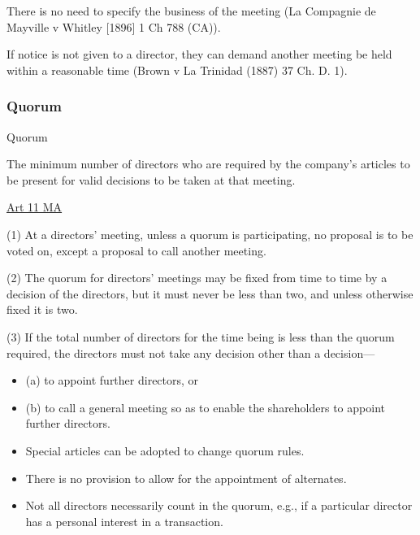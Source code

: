 \documentclass[
]{article}
\providecommand{\tightlist}{%
  \setlength{\itemsep}{0pt}\setlength{\parskip}{0pt}}
\newenvironment{env-12fb5320-b8eb-47b6-8035-097e16242c42}
{
    \savenotes\tcolorbox[blanker,breakable,left=5pt,borderline west={2pt}{-4pt}{green}]
}
{
    \endtcolorbox\spewnotes
}
\newenvironment{env-b20d3313-6f31-4d49-96f7-b40d8676adb1}
{
    \savenotes\tcolorbox[blanker,breakable,left=5pt,borderline west={2pt}{-4pt}{yellow}]
}
{
    \endtcolorbox\spewnotes
}
\begin{document}
There is no need to specify the business of the meeting (La Compagnie de
Mayville v Whitley {[}1896{]} 1 Ch 788 (CA)).

If notice is not given to a director, they can demand another meeting be
held within a reasonable time (Brown v La Trinidad (1887) 37 Ch. D. 1).

\hypertarget{quorum}{%
\subsubsection{Quorum}\label{quorum}}

\begin{env-b20d3313-6f31-4d49-96f7-b40d8676adb1}

Quorum

The minimum number of directors who are required by the company's
articles to be present for valid decisions to be taken at that meeting.

\end{env-b20d3313-6f31-4d49-96f7-b40d8676adb1}

\begin{env-12fb5320-b8eb-47b6-8035-097e16242c42}

\href{https://www.gov.uk/government/publications/model-articles-for-private-companies-limited-by-shares/model-articles-for-private-companies-limited-by-shares\#quorum}{Art
11 MA}

(1) At a directors' meeting, unless a quorum is participating, no
proposal is to be voted on, except a proposal to call another meeting.

(2) The quorum for directors' meetings may be fixed from time to time by
a decision of the directors, but it must never be less than two, and
unless otherwise fixed it is two.

(3) If the total number of directors for the time being is less than the
quorum required, the directors must not take any decision other than a
decision---

\begin{itemize}
\tightlist
\item
  (a) to appoint further directors, or
\item
  (b) to call a general meeting so as to enable the shareholders to
  appoint further directors.
\end{itemize}

\end{env-12fb5320-b8eb-47b6-8035-097e16242c42}

\begin{itemize}
\tightlist
\item
  Special articles can be adopted to change quorum rules.
\item
  There is no provision to allow for the appointment of alternates.
\item
  Not all directors necessarily count in the quorum, e.g., if a
  particular director has a personal interest in a transaction.
\end{itemize}
\end{document}
